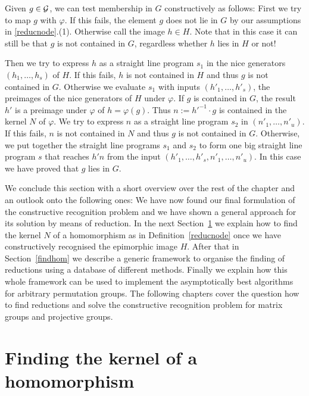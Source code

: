 Given $g \in \mathcal{G}$, we can test membership in $G$ constructively as follows:
First we try to map $g$ with $\varphi$. If this fails, the element $g$
does not lie in $G$ by our assumptions in \ref{reducnode}.(1). Otherwise
call the image $h \in H$. Note that in this case it can still be that
$g$ is not contained in $G$, regardless whether $h$ lies in $H$ or not! 

Then we try to express $h$ as a straight 
line program $s_1$ in the nice generators $(h_1, \ldots, h_s)$ of $H$. If this
fails, $h$ is not contained in $H$ and thus $g$ is not contained in
$G$. Otherwise we evaluate $s_1$ with inputs
$(h'_1, \ldots, h'_s)$, the preimages of the nice generators of $H$ under
$\varphi$. If $g$ is contained in $G$, the result $h'$ is a preimage 
under $\varphi$ of $h = \varphi(g)$. Thus $n := h'^{-1}\cdot g$ is contained
in the kernel $N$ of $\varphi$. We try to express $n$ as a straight
line program $s_2$ in $(n'_1, \ldots, n'_u)$. If this fails, $n$
is not contained in $N$ and thus $g$ is not contained in $G$. Otherwise,
we put together the straight line programs $s_1$ and $s_2$ to form
one big straight line program $s$ that reaches $h'n$ from the input 
$(h'_1, \ldots, h'_s, n'_1, \ldots, n'_u)$. In this case we have proved
that $g$ lies in $G$.
\proofend

\medskip
We conclude this section with a short overview over the rest of the chapter
and an outlook onto the following ones:
We have now found our final formulation of the constructive
recognition problem and we have shown a general approach for its solution
by means of reduction. In the next Section~\ref{findkernel} we explain how
to find the kernel $N$ of a homomorphism as in Definition~\ref{reducnode}
once we have constructively recognised the epimorphic image $H$. After that
in Section~\ref{findhom} we describe a generic framework to organise the
finding of reductions using a database of different methods. Finally we
explain how this whole framework can be used to implement the
asymptotically best algorithms for arbitrary permutation groups.
The following chapters cover the question how to find reductions
and solve the constructive recognition problem for matrix groups and
projective groups.

\section{Finding the kernel of a homomorphism}
\label{findkernel}

